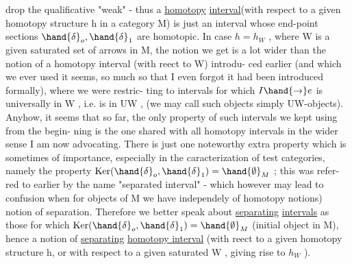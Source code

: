 
drop the qualificative "weak" - thus  a \uline{homotopy} \uline{interval}(with respect
to a given homotopy structure h in a category M) is just an interval
whose end-point sections $\hand{\delta}_o,\hand{\delta}_1$ are homotopic. In case $h=h_W$ , where W
is a given saturated set of arrows in M, the notion we get is a lot 
wider than the notion of a homotopy interval (with reect to W) introdu-%
ced earlier  (and which we  ever used it seems, so much so that
I even forgot  it had been introduced formally), where we were restric-%
ting to intervals for which $I \hand{\to} e$ is universally in W , i.e. is in UW ,
(we may call such objects simply UW-objects). Anyhow, it seems that so
far, the only property of such intervals we kept using from the begin-%
ning  is the one shared with all homotopy intervals in the wider
sense I am now advocating. There is just one noteworthy extra property
which is sometimes of importance, especially in the caracterization of
test categories, namely the property $\mathrm{Ker}(\hand{\delta}_o,\hand{\delta}_1) = \hand{\emptyset}_M$ ; this was refer-%
red to earlier by the name "separated interval" - which however may
lead to confusion when for objects of M we have \hand{(}independely of homotopy
notions)  notion of separation. Therefore we better speak about
\uline{separating} \uline{intervals} as those for which $\mathrm{Ker}(\hand{\delta}_o,\hand{\delta}_1) = \hand{\emptyset}_M$ (initial object
in M), hence a notion of \uline{separating} \uline{homotopy interval} (with reect to
a given homotopy structure h, or with respect to a given saturated W ,
giving rise to $h_W$ ).

